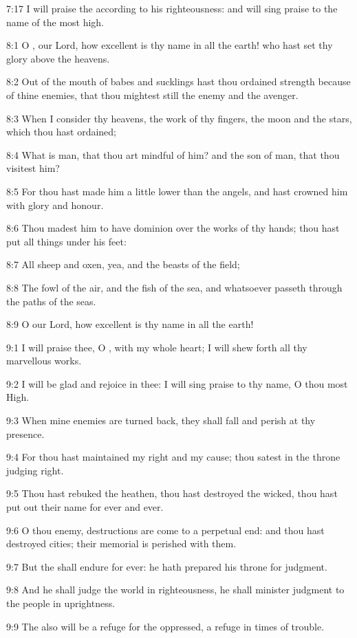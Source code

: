 7:17 I will praise the \LORD according to his righteousness: and will
sing praise to the name of the \LORD most high.



8:1 O \LORD, our Lord, how excellent is thy name in all the earth! who
hast set thy glory above the heavens.

8:2 Out of the mouth of babes and sucklings hast thou ordained
strength because of thine enemies, that thou mightest still the enemy
and the avenger.

8:3 When I consider thy heavens, the work of thy fingers, the moon and
the stars, which thou hast ordained;

8:4 What is man, that thou art mindful of him? and the son of man,
that thou visitest him?

8:5 For thou hast made him a little lower than the angels, and hast
crowned him with glory and honour.

8:6 Thou madest him to have dominion over the works of thy hands; thou
hast put all things under his feet:

8:7 All sheep and oxen, yea, and the beasts of the field;

8:8 The fowl of the air, and the fish of the sea, and whatsoever
passeth through the paths of the seas.

8:9 O \LORD our Lord, how excellent is thy name in all the earth!


9:1 I will praise thee, O \LORD, with my whole heart; I will shew forth
all thy marvellous works.

9:2 I will be glad and rejoice in thee: I will sing praise to thy
name, O thou most High.

9:3 When mine enemies are turned back, they shall fall and perish at
thy presence.

9:4 For thou hast maintained my right and my cause; thou satest in the
throne judging right.

9:5 Thou hast rebuked the heathen, thou hast destroyed the wicked,
thou hast put out their name for ever and ever.

9:6 O thou enemy, destructions are come to a perpetual end: and thou
hast destroyed cities; their memorial is perished with them.

9:7 But the \LORD shall endure for ever: he hath prepared his throne
for judgment.

9:8 And he shall judge the world in righteousness, he shall minister
judgment to the people in uprightness.

9:9 The \LORD also will be a refuge for the oppressed, a refuge in
times of trouble.

